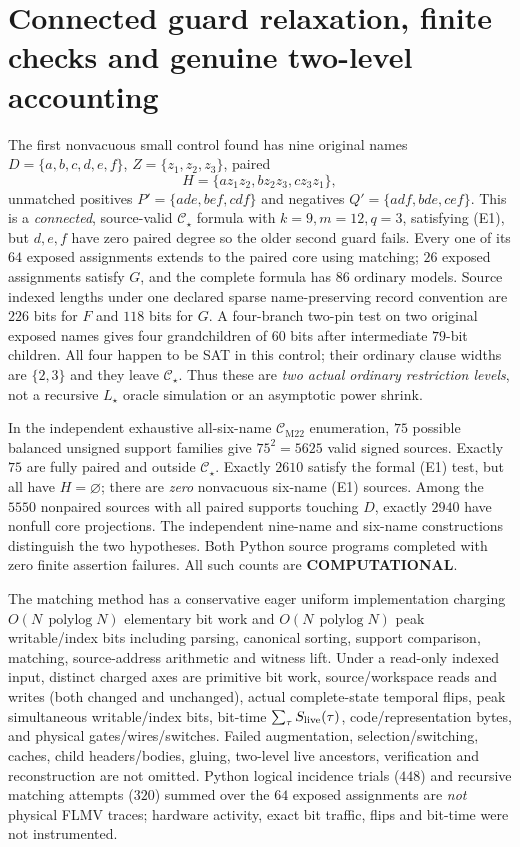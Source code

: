 \documentclass[11pt]{article}
\newcommand{\CM}{\mathcal C_{\mathrm{M22}}}
\newcommand{\CS}{\mathcal C_{\star}}
\begin{document}
\section{Connected guard relaxation, finite checks and genuine two-level accounting}
The first nonvacuous small control found has nine original names
$D=\{a,b,c,d,e,f\}$, $Z=\{z_1,z_2,z_3\}$, paired
\[
H=\{az_1z_2,bz_2z_3,cz_3z_1\},
\]
unmatched positives $P'=\{ade,bef,cdf\}$ and negatives $Q'=\{adf,bde,cef\}$. This is a \emph{connected}, source-valid $\CS$ formula with $k=9,m=12,q=3$, satisfying (E1), but $d,e,f$ have zero paired degree so the older second guard fails. Every one of its $64$ exposed assignments extends to the paired core using matching; $26$ exposed assignments satisfy $G$, and the complete formula has $86$ ordinary models. Source indexed lengths under one declared sparse name-preserving record convention are $226$ bits for $F$ and $118$ bits for $G$. A four-branch two-pin test on two original exposed names gives four grandchildren of $60$ bits after intermediate $79$-bit children. All four happen to be SAT in this control; their ordinary clause widths are $\{2,3\}$ and they leave $\CS$. Thus these are \emph{two actual ordinary restriction levels}, not a recursive $L_{\star}$ oracle simulation or an asymptotic power shrink.

In the independent exhaustive all-six-name $\CM$ enumeration, $75$ possible balanced unsigned support families give $75^2=5625$ valid signed sources. Exactly $75$ are fully paired and outside $\CS$. Exactly $2610$ satisfy the formal (E1) test, but all have $H=\varnothing$; there are \emph{zero} nonvacuous six-name (E1) sources. Among the $5550$ nonpaired sources with all paired supports touching $D$, exactly $2940$ have nonfull core projections. The independent nine-name and six-name constructions distinguish the two hypotheses. Both Python source programs completed with zero finite assertion failures. All such counts are \textbf{COMPUTATIONAL}.

The matching method has a conservative eager uniform implementation charging $O(N\,\operatorname{polylog}N)$ elementary bit work and $O(N\,\operatorname{polylog}N)$ peak writable/index bits including parsing, canonical sorting, support comparison, matching, source-address arithmetic and witness lift. Under a read-only indexed input, distinct charged axes are primitive bit work, source/workspace reads and writes (both changed and unchanged), actual complete-state temporal flips, peak simultaneous writable/index bits, bit-time $\sum_\tau S_{\rm live}(\tau)$, code/representation bytes, and physical gates/wires/switches. Failed augmentation, selection/switching, caches, child headers/bodies, gluing, two-level live ancestors, verification and reconstruction are not omitted. Python logical incidence trials ($448$) and recursive matching attempts ($320$) summed over the $64$ exposed assignments are \emph{not} physical FLMV traces; hardware activity, exact bit traffic, flips and bit-time were not instrumented.
\end{document}
